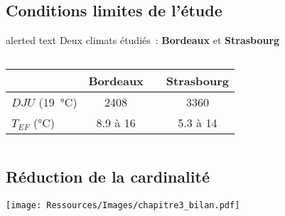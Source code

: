 \documentclass[xcolor=x11names, compress, 11pt]{beamer}
\newcommand{\addalert}[1]{%
\begin{beamercolorbox}[sep=2pt,center,shadow=true,rounded=true]{alerted text}
    #1\par%
\end{beamercolorbox}%
}
\begin{document}
\subsection{Conditions limites de l’étude}
\begin{frame}[t]
    \centering
    \addalert{\small Deux climats étudiés~: \textbf{Bordeaux} et \textbf{Strasbourg}}
    \vfill
    \scriptsize
    \begin{columns}
        \begin{column}{0.5\textwidth}
            \begin{table}
            \begin{tabular}{l c c c}
                \toprule
                                               & Bordeaux           &  & Strasbourg          \\
                \midrule
                $DJU$ (\SI{19}{\celsius})      & \num{2408}         &  & \num{3360}          \\
                \addlinespace[\defaultaddspace]
                $T_{EF}$ (\si{\celsius})       & \num{8.9} à \num{16}  &  & \num{5.3} à \num{14}    \\
                \bottomrule
            \end{tabular}
            \end{table}
        \end{column}
        \begin{column}{0.5\textwidth}
        \end{column}
    \end{columns}
    \vfill

    \vfill
\end{frame}


\subsection{Réduction de la cardinalité}
\begin{frame}[t]
    \vfill
    \centering
    \texttt{[image: Ressources/Images/chapitre3\_bilan.pdf]}
    \vfill
\end{frame}
\end{document}
